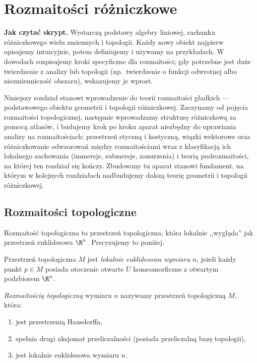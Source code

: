 \chapter{Rozmaitości różniczkowe}
\label{ch:rozmaitosci}

\noindent\textbf{Jak czytać skrypt.}
Wystarczą podstawy algebry liniowej, rachunku różniczkowego
wielu zmiennych i topologii. Każdy nowy obiekt najpierw
opisujemy intuicyjnie, potem definiujemy i używamy na
przykładach. W dowodach rozpisujemy kroki specyficzne dla
rozmaitości; gdy potrzebne jest duże twierdzenie z analizy
lub topologii (np.\ twierdzenie o funkcji odwrotnej albo
niezmienniczość obszaru), wskazujemy je wprost.

Niniejszy rozdział stanowi wprowadzenie do teorii rozmaitości gładkich — podstawowego
obiektu geometrii i topologii różniczkowej. Zaczynamy od pojęcia rozmaitości topologicznej,
następnie wprowadzamy strukturę różniczkową za pomocą atlasów, i budujemy krok po kroku
aparat niezbędny do uprawiania analizy na rozmaitościach: przestrzeń styczną i kostyczną,
wiązki wektorowe oraz różniczkowanie odwzorowań między rozmaitościami wraz z klasyfikacją
ich lokalnego zachowania (immersje, submersje, zanurzenia) i teorią podrozmaitości, na
której ten rozdział się kończy. Zbudowany tu aparat stanowi fundament, na którym w
kolejnych rozdziałach nadbudujemy dalszą teorię geometrii i topologii różniczkowej.



\section{Rozmaitości topologiczne}

Rozmaitość topologiczna to przestrzeń topologiczna, która lokalnie ,,wygląda'' jak
przestrzeń euklidesowa $\R^n$. Precyzujemy to poniżej.

\begin{definicja}
Przestrzeń topologiczna $M$ jest \emph{lokalnie euklidesowa wymiaru $n$}, jeżeli każdy
punkt $p\in M$ posiada otoczenie otwarte $U$ homeomorficzne z otwartym podzbiorem $\R^n$.
\end{definicja}

\begin{definicja}
\emph{Rozmaitością topologiczną} wymiaru $n$ nazywamy przestrzeń topologiczną $M$, która:
\begin{enumerate}[label=(\roman*)]
\item jest przestrzenią Hausdorffa,
\item spełnia drugi aksjomat przeliczalności (posiada przeliczalną bazę topologii),
\item jest lokalnie euklidesowa wymiaru $n$.
\end{enumerate}
\end{definicja}

